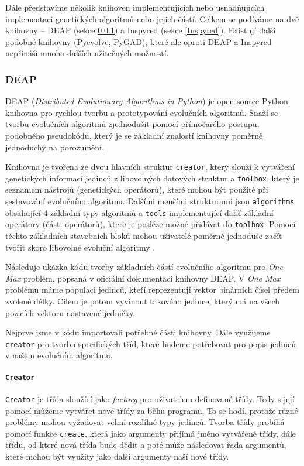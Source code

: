 Dále představíme několik knihoven implementujících nebo usnadňujících
implementaci genetických algoritmů nebo jejich částí. Celkem se podíváme na dvě
knihovny -- DEAP (sekce \ref{DEAP}) a Inspyred (sekce \ref{Inspyred}).
Existují další podobné knihovny (Pyevolve, PyGAD), které ale oproti DEAP a
Inspyred nepřináší mnoho dalších užitečných možností.

\subsubsection{DEAP} \label{DEAP}

DEAP (\emph{Distributed Evolutionary Algorithms in Python}) \citep{deapproject}
je open-source Python knihovna pro rychlou tvorbu a prototypování evolučních
algoritmů. Snaží se tvorbu evolučních algoritmů zjednodušit pomocí přímočarého
postupu, podobného pseudokódu, který je se základní znalostí knihovny poměrně
jednoduchý na porozumění. 

Knihovna je tvořena ze dvou hlavních struktur \texttt{creator}, který slouží k
vytváření genetických informací jedinců z libovolných datových struktur a
\texttt{toolbox}, který je seznamem nástrojů (genetických operátorů), které
mohou být použité při sestavování evolučního algoritmu. Dalšími menšími
strukturami jsou \texttt{algorithms} obsahující 4 základní typy algoritmů a
\texttt{tools} implementující další základní operátory (části operátorů), které
je posléze možné přidávat do \texttt{toolbox}. Pomocí těchto základních
stavebních bloků mohou uživatelé poměrně jednoduše začít tvořit skoro libovolné
evoluční algoritmy \citep{fortin2012deap}. 

Následuje ukázka kódu tvorby základních částí evolučního algoritmu pro
\emph{One Max} problém, popsaná v oficiální dokumentaci knihovny DEAP. V
\emph{One Max} problému máme populaci jedinců, kteří reprezentují vektor
binárních čísel předem zvolené délky. Cílem je potom vyvinout takového jedince,
který má na všech pozicích vektoru nastavené jedničky. 

Nejprve jsme v kódu importovali potřebné části knihovny. Dále využijeme
\texttt{creator} pro tvorbu specifických tříd, které budeme potřebovat pro
popis jedinců v našem evolučním algoritmu.

\paragraph{\texttt{Creator}} 
\texttt{Creator} je třída sloužící jako \emph{factory} pro uživatelem
definované třídy. Tedy s její pomocí můžeme vytvářet nové třídy za běhu
programu. To se hodí, protože různé problémy mohou vyžadovat velmi rozdílné
typy jedinců. Tvorba třídy probíhá pomocí funkce \texttt{create}, která jako
argumenty přijímá jméno vytvářené třídy, dále třídu, od které nová třída bude
dědit a poté může následovat řada argumentů, které mohou být využity jako další
argumenty naší nové třídy.


